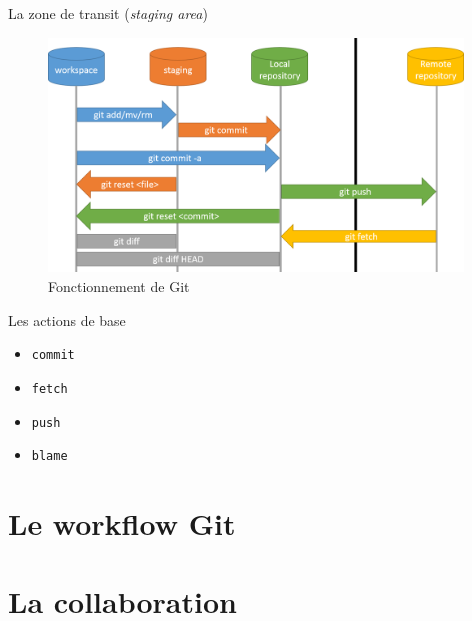 \documentclass[xcolor=x11names,compress]{beamer}
\begin{document}
\begin{frame}{La zone de transit (\textit{staging area})}
	\begin{figure}[H]
		\vspace{-10px}
		\includegraphics[width=11cm]{images/section1/staging.png}
		\caption{Fonctionnement de Git}
	\end{figure}	
\end{frame}
\begin{frame}{Les actions de base}
\begin{itemize}
	\item \texttt{commit}
	\item \texttt{fetch}
	\item \texttt{push}
	\item \texttt{blame}
\end{itemize}
\end{frame}
\section{Le workflow Git}
\section{La collaboration}

\appendix
\end{document}
